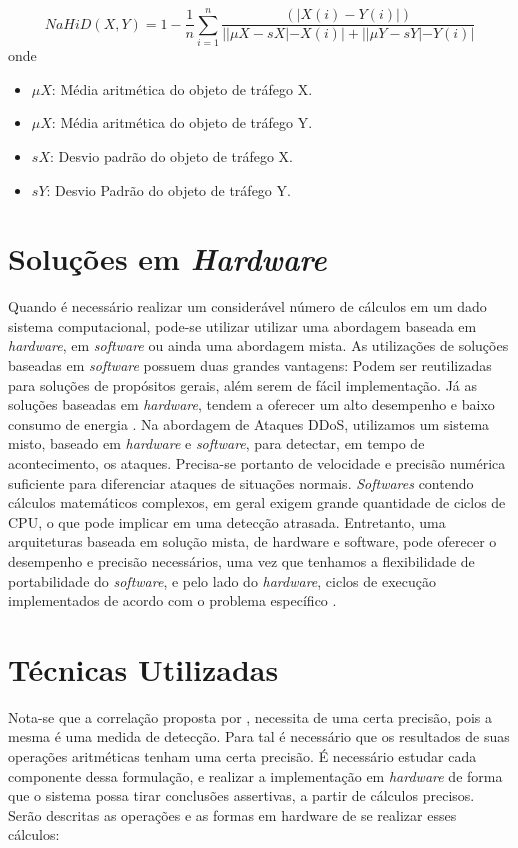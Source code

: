 \begin{equation}
NaHiD(X,Y) = 1 - \frac{1}{n} \sum_{i=1}^{n} \frac{\left(|X(i) -	 Y(i)|\right)}{||\mu{X} - sX| - X(i)| + ||\mu{Y} - sY| - Y(i)|}
\end{equation}
onde
\begin{itemize}
	\item $\mu{X}$: Média aritmética do objeto de tráfego X.
	\item $\mu{X}$: Média aritmética do objeto de tráfego Y.
	\item $sX$: Desvio padrão do objeto de tráfego X.
	\item $sY$: Desvio Padrão do objeto de tráfego Y.
\end{itemize}

\section{Soluções em \textit{Hardware}}

Quando é necessário realizar um considerável número de cálculos em um dado sistema computacional, pode-se utilizar utilizar uma abordagem baseada em \textit{hardware}, em \textit{software} ou ainda uma abordagem mista. As utilizações de soluções baseadas em \textit{software} possuem duas grandes vantagens: Podem ser reutilizadas para soluções de propósitos gerais, além serem de fácil implementação. Já as soluções baseadas em \textit{hardware}, tendem a oferecer um alto desempenho e baixo consumo de energia \cite{HOQUE201748}.  Na abordagem de Ataques DDoS, utilizamos um sistema misto, baseado em \textit{hardware} e \textit{software}, para detectar, em tempo de acontecimento, os ataques. Precisa-se portanto de velocidade e precisão numérica suficiente para diferenciar ataques de situações normais. \textit{Softwares} contendo cálculos matemáticos complexos, em geral exigem grande quantidade de ciclos de CPU, o que pode implicar em uma detecção atrasada. Entretanto, uma arquiteturas baseada em solução mista, de hardware e software, pode oferecer o desempenho e precisão necessários, uma vez que tenhamos a flexibilidade de portabilidade do \textit{software}, e pelo lado do \textit{hardware}, ciclos de execução implementados de acordo com o problema específico \cite{miranda2002computador} .

\section{Técnicas Utilizadas}
Nota-se que a correlação proposta por \cite{HOQUE201748}, necessita de uma certa precisão, pois a mesma é uma medida de detecção. Para tal é necessário que os resultados de suas operações aritméticas tenham uma certa precisão. É  necessário estudar cada componente dessa formulação, e realizar a implementação em \textit{hardware} de forma que o sistema possa tirar conclusões assertivas, a partir de cálculos precisos. Serão descritas as operações e as formas em hardware de se realizar esses cálculos:

